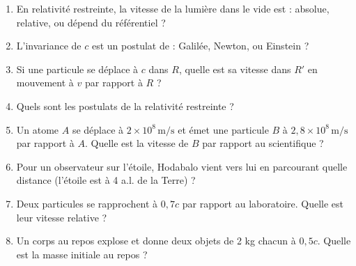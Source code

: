 \documentclass[12pt,a4paper]{article}
\begin{document}
\begin{boiteexercice}
\begin{enumerate}
  \item En relativité restreinte, la vitesse de la lumière dans le vide est : absolue, relative, ou dépend du référentiel ?
  \item L'invariance de $c$ est un postulat de : Galilée, Newton, ou Einstein ?
  \item Si une particule se déplace à $c$ dans $R$, quelle est sa vitesse dans $R'$ en mouvement à $v$ par rapport à $R$ ?
  \item Quels sont les postulats de la relativité restreinte ?
  \item Un atome $A$ se déplace à $2\times10^8\,\text{m/s}$ et émet une particule $B$ à $2{,}8\times10^8\,\text{m/s}$ par rapport à $A$. Quelle est la vitesse de $B$ par rapport au scientifique ?
  \item Pour un observateur sur l'étoile, Hodabalo vient vers lui en parcourant quelle distance (l'étoile est à 4 a.l. de la Terre) ?
  \item Deux particules se rapprochent à $0{,}7c$ par rapport au laboratoire. Quelle est leur vitesse relative ?
  \item Un corps au repos explose et donne deux objets de 2 kg chacun à $0{,}5c$. Quelle est la masse initiale au repos ?
\end{enumerate}
\end{boiteexercice}
\end{document}

